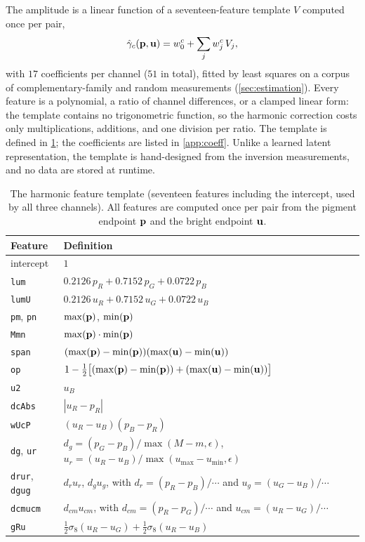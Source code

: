 The amplitude is a linear function of a seventeen-feature template $V$ computed once per pair,
\begin{equation}
\hat{\gamma}_{c}(\mathbf{p},\mathbf{u})=w_{0}^{c}+\sum_{j}w_{j}^{c}\,V_{j},
\label{eq:gamma}
\end{equation}
with $17$ coefficients per channel ($51$ in total), fitted by least squares on a corpus of complementary-family and random measurements (\cref{sec:estimation}). Every feature is a polynomial, a ratio of channel differences, or a clamped linear form: the template contains no trigonometric function, so the harmonic correction costs only multiplications, additions, and one division per ratio. The template is defined in \cref{tab:features}; the coefficients are listed in \cref{app:coeff}. Unlike a learned latent representation, the template is hand-designed from the inversion measurements, and no data are stored at runtime.

\begin{table}[t]
\centering
\scriptsize
\setlength{\tabcolsep}{3pt}
\caption{The harmonic feature template (seventeen features including the intercept, used by all three channels). All features are computed once per pair from the pigment endpoint $\mathbf{p}$ and the bright endpoint $\mathbf{u}$.}
\label{tab:features}
\begin{tabular}{ll}
\toprule
Feature & Definition \\
\midrule
intercept & $1$ \\
\texttt{lum} & $0.2126\,p_{R}+0.7152\,p_{G}+0.0722\,p_{B}$ \\
\texttt{lumU} & $0.2126\,u_{R}+0.7152\,u_{G}+0.0722\,u_{B}$ \\
\texttt{pm}, \texttt{pn} & $\max(\mathbf{p})$, $\min(\mathbf{p})$ \\
\texttt{Mmn} & $\max(\mathbf{p})\cdot\min(\mathbf{p})$ \\
\texttt{span} & $(\max(\mathbf{p})-\min(\mathbf{p}))(\max(\mathbf{u})-\min(\mathbf{u}))$ \\
\texttt{op} & $1-\tfrac12\bigl[(\max(\mathbf{p})-\min(\mathbf{p}))+(\max(\mathbf{u})-\min(\mathbf{u}))\bigr]$ \\
\texttt{u2} & $u_{B}$ \\
\texttt{dcAbs} & $|u_{R}-p_{R}|$ \\
\texttt{wUcP} & $(u_{R}-u_{B})(p_{B}-p_{R})$ \\
\texttt{dg}, \texttt{ur} & $d_{g}=(p_{G}-p_{B})/\max(M-m,\epsilon)$,\quad $u_{r}=(u_{R}-u_{B})/\max(u_{\max}-u_{\min},\epsilon)$ \\
\texttt{drur}, \texttt{dgug} & $d_{r}u_{r}$, $d_{g}u_{g}$, with $d_{r}=(p_{R}-p_{B})/\cdots$ and $u_{g}=(u_{G}-u_{B})/\cdots$ \\
\texttt{dcmucm} & $d_{cm}u_{cm}$, with $d_{cm}=(p_{R}-p_{G})/\cdots$ and $u_{cm}=(u_{R}-u_{G})/\cdots$ \\
\texttt{gRu} & $\tfrac12\sigma_{8}(u_{R}-u_{G})+\tfrac12\sigma_{8}(u_{R}-u_{B})$ \\
\bottomrule
\end{tabular}
\end{table}

